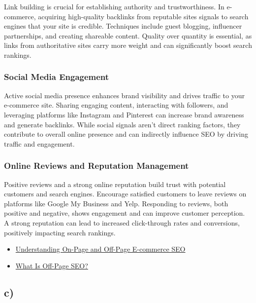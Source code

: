 \documentclass[
]{report}
\providecommand{\tightlist}{%
  \setlength{\itemsep}{0pt}\setlength{\parskip}{0pt}}\usepackage{longtable,booktabs,array}
\begin{document}
Link building is crucial for establishing authority and trustworthiness.
In e-commerce, acquiring high-quality backlinks from reputable sites
signals to search engines that your site is credible. Techniques include
guest blogging, influencer partnerships, and creating shareable content.
Quality over quantity is essential, as links from authoritative sites
carry more weight and can significantly boost search rankings.

\subsubsection{Social Media Engagement}\label{social-media-engagement}

Active social media presence enhances brand visibility and drives
traffic to your e-commerce site. Sharing engaging content, interacting
with followers, and leveraging platforms like Instagram and Pinterest
can increase brand awareness and generate backlinks. While social
signals aren't direct ranking factors, they contribute to overall online
presence and can indirectly influence SEO by driving traffic and
engagement.

\subsubsection{Online Reviews and Reputation
Management}\label{online-reviews-and-reputation-management}

Positive reviews and a strong online reputation build trust with
potential customers and search engines. Encourage satisfied customers to
leave reviews on platforms like Google My Business and Yelp. Responding
to reviews, both positive and negative, shows engagement and can improve
customer perception. A strong reputation can lead to increased
click-through rates and conversions, positively impacting search
rankings.

\begin{itemize}
\tightlist
\item
  \href{https://blog.bluetuskr.com/on-page-and-off-page-seo-ecommerce}{Understanding
  On-Page and Off-Page E-commerce SEO}
\item
  \href{https://www.semrush.com/blog/off-page-seo/}{What Is Off-Page
  SEO?}
\end{itemize}

\subsection{c)}\label{c}
\end{document}
